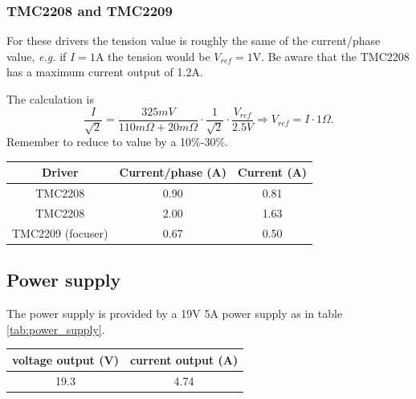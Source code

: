 \documentclass{article}
\begin{document}
\begin{multicols}{2}
        \subsubsection{TMC2208 and TMC2209}
        For these drivers the tension value is roughly the same of the current/phase value, \textit{e.g.} if \(I=1\)A the tension would be \(V_{ref}=1\)V.
        Be aware that the TMC2208 has a maximum current output of 1.2A.

        The calculation is 
        \[\frac{I}{\sqrt{2}}=\frac{325mV}{110m\Omega+20m\Omega}\cdot\frac{1}{\sqrt{2}}\cdot\frac{V_{ref}}{2.5V}\Rightarrow V_{ref} = I \cdot 1\Omega.\]
        Remember to reduce to value by a 10\%-30\%.

        \begin{minipage}
            {.4\textwidth}
            \begin{tabular}{ccc}
               Driver & Current/phase (A) & Current (A) \\
                \hline
               TMC2208 & 0.90 & 0.81 \\
               TMC2208 &  2.00 & 1.63 \\                
               TMC2209 (focuser) &  0.67 & 0.50                
            \end{tabular}
            \label{tab:drivers_curr}
        \end{minipage} 



        \subsection{Power supply}
        The power supply is provided by a 19V 5A power supply as in table \ref{tab:power_supply}.

        \begin{minipage}
            {.4\textwidth}
            \begin{tabular}{cc}
                 voltage output (V) & current output (A) \\
                 \hline
                19.3 & 4.74 \\
            \end{tabular}
            \label{tab:power_supply}
        \end{minipage}


\end{multicols}
\end{document}
